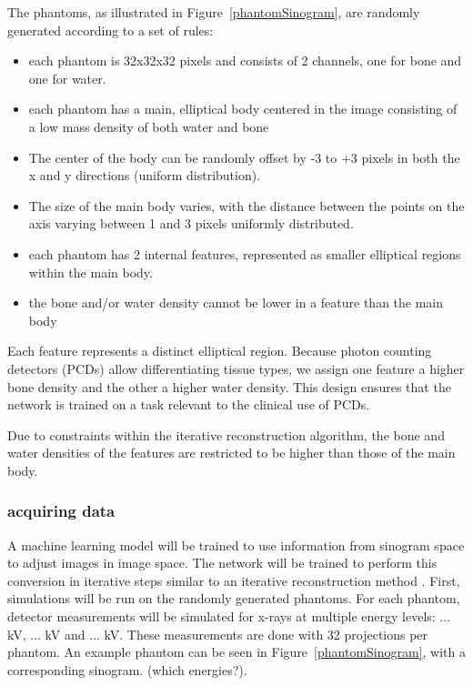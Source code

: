 \documentclass{article}
\begin{document}
The phantoms, as illustrated in Figure~\ref{phantomSinogram}, are randomly generated according to a set of rules:

\begin{itemize}
\item each phantom is 32x32x32 pixels and consists of 2 channels, one for bone and one for water.
\item each phantom has a main, elliptical body centered in the image consisting of a low mass density of both water and bone
\item The center of the body can be randomly offset by -3 to +3 pixels in both the x and y directions (uniform distribution).
\item The size of the main body varies, with the distance between the points on the axis varying between 1 and 3 pixels uniformly distributed.
\item each phantom has 2 internal features, represented as smaller elliptical regions within the main body.
\item the bone and/or water density cannot be lower in a feature than the main body
\end{itemize}

Each feature represents a distinct elliptical region. Because photon counting detectors (PCDs) allow differentiating tissue types, we assign one feature a higher bone density and the other a higher water density. This design ensures that the network is trained on a task relevant to the clinical use of PCDs.

Due to constraints within the iterative reconstruction algorithm, the bone and water densities of the features are restricted to be higher than those of the main body.

\subsubsection{acquiring data}

A machine learning model will be trained to use information from sinogram space to adjust images in image space. The network will be trained to perform this conversion in iterative steps similar to an iterative reconstruction method \citep{mechlem2018joint}.
First, simulations will be run on the randomly generated phantoms. For each phantom, detector measurements will be simulated for x-rays at multiple energy levels: ... kV, ... kV and ... kV. These measurements are done with 32 projections per phantom. An example phantom can be seen in Figure~\ref{phantomSinogram}, with a corresponding sinogram. (which energies?).
\end{document}

